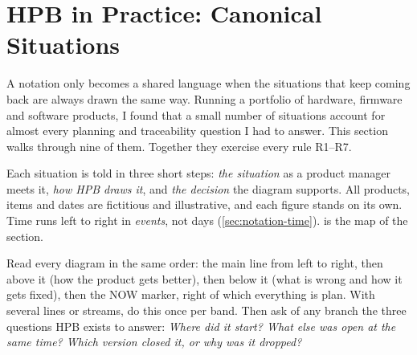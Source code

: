 \section{HPB in Practice: Canonical Situations}
\label{sec:practice}

A notation only becomes a shared language when the situations that keep
coming back are always drawn the same way. Running a portfolio of
hardware, firmware and software products, I found that a small number of
situations account for almost every planning and traceability question I
had to answer. This section walks through nine of them. Together they
exercise every rule R1--R7.

Each situation is told in three short steps: \emph{the situation} as a
product manager meets it, \emph{how HPB draws it}, and \emph{the decision}
the diagram supports. All products, items and dates are fictitious and
illustrative, and each figure stands on its own. Time runs left to right
in \emph{events}, not days (\cref{sec:notation-time}).
 is the map of the section.

Read every diagram in the same order: the main line from left to right,
then above it (how the product gets better), then below it (what is wrong
and how it gets fixed), then the NOW marker, right of which everything is
plan. With several lines or streams, do this once per band. Then ask of
any branch the three questions HPB exists to answer: \emph{Where did it
start? What else was open at the same time? Which version closed it, or
why was it dropped?}

